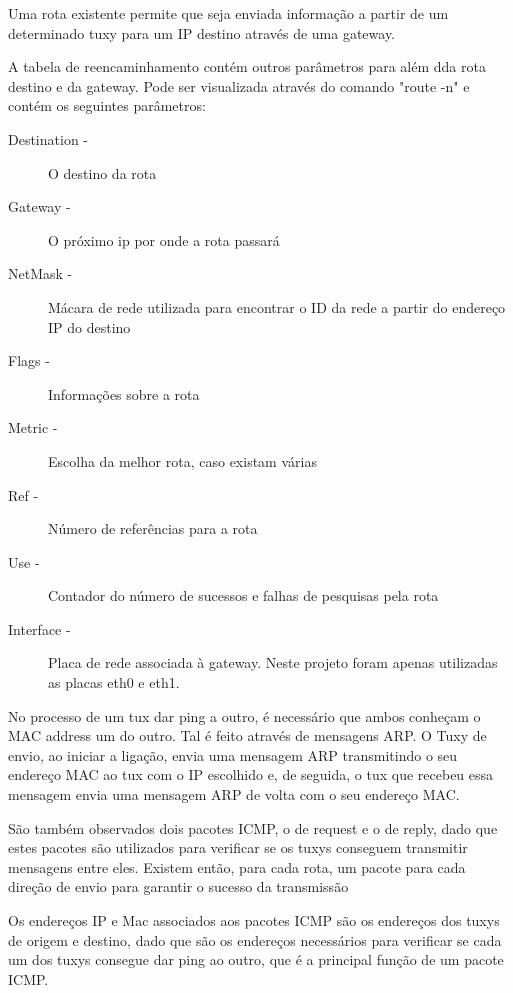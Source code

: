 \documentclass[11pt]{article}
\begin{document}
Uma rota existente permite que seja enviada informação a partir de um determinado tuxy para um IP destino através de uma gateway.


A tabela de reencaminhamento contém outros parâmetros para além dda rota destino e da gateway. Pode ser visualizada através do comando "route -n" e contém os seguintes parâmetros:

\begin{description}

\item[Destination -] O destino da rota

\item[Gateway -] O próximo ip por onde a rota passará

\item[NetMask -] Mácara de rede utilizada para encontrar o ID da rede a partir do endereço IP do destino

\item[Flags -] Informações sobre a rota

\item[Metric -] Escolha da melhor rota, caso existam várias

\item[Ref -] Número de referências para a rota

\item[Use -] Contador do número de sucessos e falhas de pesquisas pela rota

\item[Interface -] Placa de rede associada à gateway. Neste projeto foram apenas utilizadas as placas eth0 e eth1.

\end{description}

No processo de um tux dar ping a outro, é necessário que ambos conheçam o MAC address um do outro.
Tal é feito através de mensagens ARP. O Tuxy de envio, ao iniciar a ligação, envia uma mensagem ARP transmitindo o seu endereço MAC ao tux com o IP escolhido e, de seguida, o tux que recebeu essa mensagem envia uma mensagem ARP de volta com o seu endereço MAC.

São também observados dois pacotes ICMP, o de request e o de reply, dado que estes pacotes são utilizados para verificar se os tuxys conseguem transmitir mensagens entre eles. Existem então, para cada rota, um pacote para cada direção de envio para garantir o sucesso da transmissão


Os endereços IP e Mac associados aos pacotes ICMP são os endereços dos tuxys de origem e destino, dado que são os endereços necessários para verificar se cada um dos tuxys consegue dar ping ao outro, que é a principal função de um pacote ICMP. 
\end{document}
